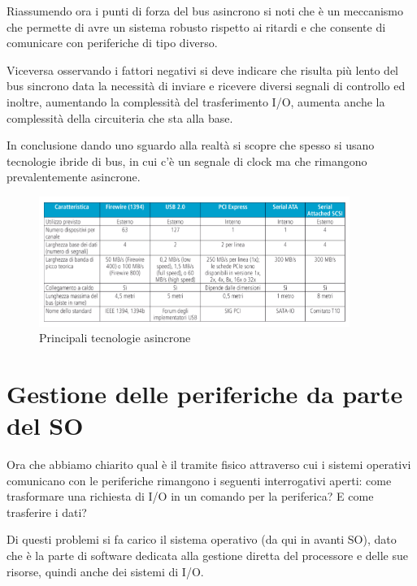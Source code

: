 \documentclass[class=book, crop=false, oneside]{standalone}
\begin{document}
Riassumendo ora i punti di forza del bus asincrono si noti che è un meccanismo che permette di avre un sistema robusto rispetto ai ritardi e che consente di comunicare con periferiche di tipo diverso.

Viceversa osservando i fattori negativi si deve indicare che risulta più lento del bus sincrono data la necessità di inviare e ricevere diversi segnali di controllo ed inoltre, aumentando la complessità del trasferimento I/O, aumenta anche la complessità della circuiteria che sta alla base.

In conclusione dando uno sguardo alla realtà si scopre che spesso si usano tecnologie ibride di bus, in cui c’è un segnale di clock ma che rimangono prevalentemente asincrone.

\begin{figure}[H]
	\centering
	\includegraphics[width=0.9\textwidth,keepaspectratio]{tecnologie-asincrone}
	\caption{Principali tecnologie asincrone}
\end{figure}


\section{Gestione delle periferiche da parte del SO}
Ora che abbiamo chiarito qual è il tramite fisico attraverso cui i sistemi operativi comunicano con le periferiche rimangono i seguenti interrogativi aperti: come trasformare una richiesta di I/O in un comando per la periferica? E come trasferire i dati?

Di questi problemi si fa carico il sistema operativo (da qui in avanti SO), dato che è la parte di software dedicata alla gestione diretta del processore e delle sue risorse, quindi anche dei sistemi di I/O.
\end{document}
